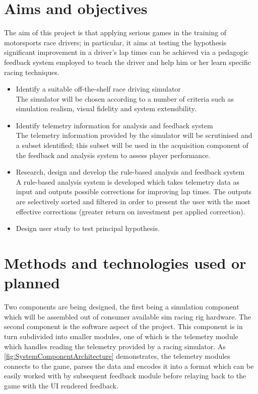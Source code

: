 \documentclass{article}
\begin{document}
\section{Aims and objectives}

The aim of this project is that applying serious games in the training of motorsports race drivers; in particular, it aims at testing the hypothesis significant improvement in a driver's lap times can be achieved via a pedagogic feedback system employed to teach the driver and help him or her learn specific racing techniques.

\begin{itemize}
  \item Identify a suitable off-the-shelf race driving simulator \\
  	The simulator will be chosen according to a number of criteria such as simulation realism, visual fidelity and system extensibility.

  \item Identify telemetry information for analysis and feedback system \\
  	The telemetry information provided by the simulator will be scrutinised and a subset identified; this subset will be used in the acquisition component of the feedback and analysis system to assess player performance.

  \item Research, design and develop the rule-based analysis and feedback system \\
  	A rule-based analysis system is developed which takes telemetry data as input and outputs possible corrections for improving lap times. The outputs are selectively sorted and filtered in order to present the user with the most effective corrections (greater return on investment per applied correction).

  \item Design user study to test principal hypothesis.
\end{itemize}

\section{Methods and technologies used or planned}

Two components are being designed, the first being a simulation component which will be assembled out of consumer available sim racing rig hardware. The second component is the software aspect of the project. This component is in turn subdivided into smaller modules, one of which is the telemetry module which handles reading the telemetry provided by a racing simulator. As \ref{fig:SystemComponentArchitecture} demonstrates, the telemetry modules connects to the game, parses the data and encodes it into a format which can be easily worked with by subsequent feedback module before relaying back to the game with the UI rendered feedback.
\end{document}
